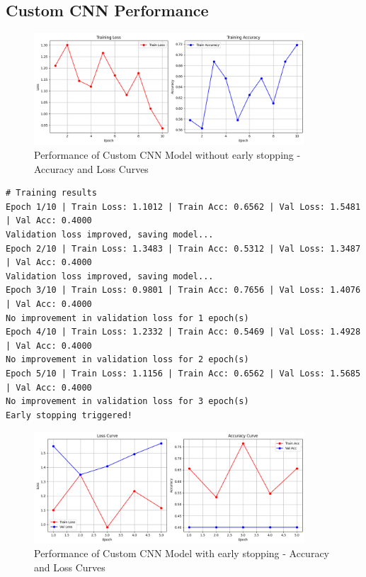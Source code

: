 \documentclass[a4paper,12pt]{article}
\begin{document}
\subsection*{Custom CNN Performance}
\begin{figure}[H]
    \centering
    \includegraphics[width=0.9\textwidth]{./assets/cassava/custom_acc_loss.png}
    \caption{Performance of Custom CNN Model without early stopping - Accuracy and Loss Curves}
\end{figure}

\begin{verbatim}
# Training results
Epoch 1/10 | Train Loss: 1.1012 | Train Acc: 0.6562 | Val Loss: 1.5481 | Val Acc: 0.4000
Validation loss improved, saving model...
Epoch 2/10 | Train Loss: 1.3483 | Train Acc: 0.5312 | Val Loss: 1.3487 | Val Acc: 0.4000
Validation loss improved, saving model...
Epoch 3/10 | Train Loss: 0.9801 | Train Acc: 0.7656 | Val Loss: 1.4076 | Val Acc: 0.4000
No improvement in validation loss for 1 epoch(s)
Epoch 4/10 | Train Loss: 1.2332 | Train Acc: 0.5469 | Val Loss: 1.4928 | Val Acc: 0.4000
No improvement in validation loss for 2 epoch(s)
Epoch 5/10 | Train Loss: 1.1156 | Train Acc: 0.6562 | Val Loss: 1.5685 | Val Acc: 0.4000
No improvement in validation loss for 3 epoch(s)
Early stopping triggered!
\end{verbatim}
\begin{figure}[H]
    \centering
    \includegraphics[width=0.9\textwidth]{./assets/cassava/early_custom_loss_accu.png}
    \caption{Performance of Custom CNN Model with early stopping - Accuracy and Loss Curves}
\end{figure}
\end{document}
